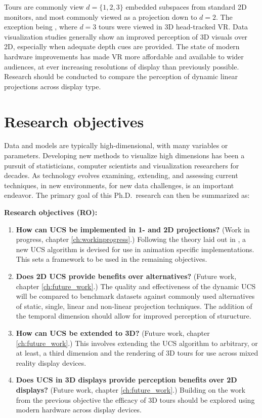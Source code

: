 \documentclass{monashthesis}
\begin{document}
Tours are commonly view \(d=\{1, 2, 3\}\) embedded subspaces from
standard 2D monitors, and most commonly viewed as a projection down to
\(d=2\). The exception being \textcite{nelson_xgobi_1998}, where \(d=3\)
tours were viewed in 3D head-tracked VR. Data visualization studies
generally show an improved perception of 3D visuals over 2D, especially
when adequate depth cues are provided. The state of modern hardware
improvements has made VR more affordable and available to wider
audiences, at ever increasing resolutions of display than previously
possible. Research should be conducted to compare the perception of
dynamic linear projections across display type.

\section{Research objectives}\label{research-objectives}

Data and models are typically high-dimensional, with many variables or
parameters. Developing new methods to visualize high dimensions has been
a pursuit of statisticians, computer scientists and visualization
researchers for decades. As technology evolves examining, extending, and
assessing current techniques, in new environments, for new data
challenges, is an important endeavor. The primary goal of this
Ph.D.~research can then be summarized as:

\textbf{Research objectives (RO):}

\begin{enumerate}
\def\labelenumi{\arabic{enumi}.}
\tightlist
\item
  \textbf{How can UCS be implemented in 1- and 2D projections?} (Work in
  progress, chapter \ref{ch:workinprogress}.) Following the theory laid
  out in \textcite{cook_manual_1997}, a new UCS algorithm is devised for
  use in animation specific implementations. This sets a framework to be
  used in the remaining objectives.
\item
  \textbf{Does 2D UCS provide benefits over alternatives?} (Future work,
  chapter \ref{ch:future_work}.) The quality and effectiveness of the
  dynamic UCS will be compared to benchmark datasets against commonly
  used alternatives of static, single, linear and non-linear projection
  techniques. The addition of the temporal dimension should allow for
  improved perception of sturucture.
\item
  \textbf{How can UCS be extended to 3D?} (Future work, chapter
  \ref{ch:future_work}.) This involves extending the UCS algorithm to
  arbitrary, or at least, a third dimension and the rendering of 3D
  tours for use across mixed reality display devices.
\item
  \textbf{Does UCS in 3D displays provide perception benefits over 2D
  displays?} (Future work, chapter \ref{ch:future_work}.) Building on
  the work from the previous objective the efficacy of 3D tours should
  be explored using modern hardware across display devices.
\end{enumerate}
\end{document}
